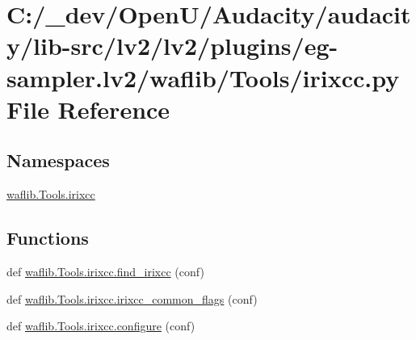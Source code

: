 \hypertarget{lv2_2plugins_2eg-sampler_8lv2_2waflib_2_tools_2irixcc_8py}{}\section{C\+:/\+\_\+dev/\+Open\+U/\+Audacity/audacity/lib-\/src/lv2/lv2/plugins/eg-\/sampler.lv2/waflib/\+Tools/irixcc.py File Reference}
\label{lv2_2plugins_2eg-sampler_8lv2_2waflib_2_tools_2irixcc_8py}
\subsection*{Namespaces}
\begin{DoxyCompactItemize}
\item 
 \hyperlink{namespacewaflib_1_1_tools_1_1irixcc}{waflib.\+Tools.\+irixcc}
\end{DoxyCompactItemize}
\subsection*{Functions}
\begin{DoxyCompactItemize}
\item 
def \hyperlink{namespacewaflib_1_1_tools_1_1irixcc_a1b02ebdb6204ff3322531ba515fe187c}{waflib.\+Tools.\+irixcc.\+find\+\_\+irixcc} (conf)
\item 
def \hyperlink{namespacewaflib_1_1_tools_1_1irixcc_a636ab22dd5bfc5c90d23c109ff5c482f}{waflib.\+Tools.\+irixcc.\+irixcc\+\_\+common\+\_\+flags} (conf)
\item 
def \hyperlink{namespacewaflib_1_1_tools_1_1irixcc_a9f81cd5d34e60c61913d7de7bb9bd224}{waflib.\+Tools.\+irixcc.\+configure} (conf)
\end{DoxyCompactItemize}
